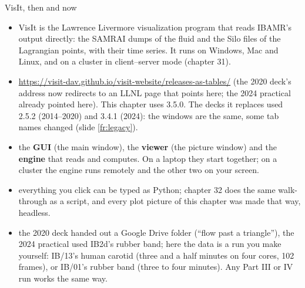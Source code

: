 \documentclass[aspectratio=169,11pt]{beamer}
\newcommand{\gui}[1]{\textsf{\textbf{#1}}}
\begin{document}
\begin{frame}{VisIt, then and now}
\label{fr:visit}
\footnotesize
\begin{itemize}
  \item VisIt is the Lawrence Livermore visualization program that reads IBAMR's output directly: the SAMRAI dumps of the fluid and the Silo files of the Lagrangian points, with their time series. It runs on Windows, Mac and Linux, and on a cluster in client--server mode (chapter 31).
  \item {} \url{https://visit-dav.github.io/visit-website/releases-as-tables/} (the 2020 deck's  address now redirects to an LLNL page that points here; the 2024 practical already pointed here). This chapter uses 3.5.0. The decks it replaces used 2.5.2 (2014--2020) and 3.4.1 (2024): the windows are the same, some tab names changed (slide \ref{fr:legacy}).
  \item {} the \gui{GUI} (the main window), the \gui{viewer} (the picture window) and the \gui{engine} that reads and computes. On a laptop they start together; on a cluster the engine runs remotely and the other two on your screen.
  \item {} everything you click can be typed as Python; chapter 32 does the same walk-through as a script, and every plot picture of this chapter was made that way, headless.
  \item {} the 2020 deck handed out a Google Drive folder (``flow past a triangle''), the 2024 practical used IB2d's rubber band; here the data is a run you make yourself: IB/13's human carotid (three and a half minutes on four cores, 102 frames), or IB/01's rubber band (three to four minutes). Any Part III or IV run works the same way.
\end{itemize}
\end{frame}
\end{document}

